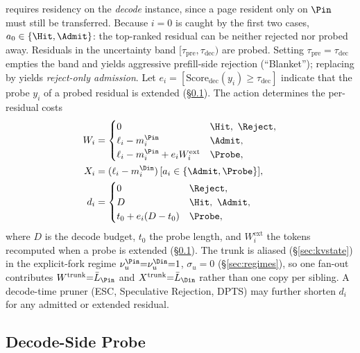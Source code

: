 \noindent
\Hit requires residency on the \emph{decode} instance, since a page resident only on $\Pin$ must still be transferred.
Because $i{=}0$ is caught by the first two cases, $a_0\in\{\Hit,\Admit\}$: the top-ranked residual can be neither rejected nor probed away.
Residuals in the uncertainty band $[\tau_{\mathrm{pre}},\tau_{\mathrm{dec}})$ are probed.
Setting $\tau_{\mathrm{pre}}{=}\tau_{\mathrm{dec}}$ empties the band and yields aggressive prefill-side rejection (``Blanket''); replacing \Probe by \Admit yields \emph{reject-only admission}.
Let $e_i{=}[\mathrm{Score}_{\mathrm{dec}}(y_i)\ge\tau_{\mathrm{dec}}]$ indicate that the probe $y_i$ of a probed residual is extended (\S\ref{sec:split}).
The action determines the per-residual costs
\begin{align}
W_i &=
\begin{cases}
0 & \Hit,\ \Reject,\\
\ell_i-m_i^{\Pin} & \Admit,\\
\ell_i-m_i^{\Pin}+e_iW_i^{\mathrm{ext}} & \Probe,
\end{cases}
\label{eq:work}\\
X_i &= (\ell_i-m_i^{\Din})\,[a_i\in\{\Admit,\Probe\}],
\label{eq:xfer}\\
d_i &=
\begin{cases}
0 & \Reject,\\
D & \Hit,\ \Admit,\\
t_0+e_i(D-t_0) & \Probe,
\end{cases}
\label{eq:dec}
\end{align}
where $D$ is the decode budget, $t_0$ the probe length, and $W_i^{\mathrm{ext}}$ the tokens recomputed when a probe is extended (\S\ref{sec:split}).
The trunk is aliased (\S\ref{sec:kvstate}) in the explicit-fork regime $\nu_u^{\Pin}{=}\nu_u^{\Din}{=}1$, $\sigma_u{=}0$ (\S\ref{sec:regimes}), so one fan-out contributes $W^{\mathrm{trunk}}{=}\bar L_{\Pin}$ and $X^{\mathrm{trunk}}{=}\bar L_{\Din}$ rather than one copy per sibling.
A decode-time pruner (ESC, Speculative Rejection, DPTS) may further shorten $d_i$ for any admitted or extended residual.

\subsection{Decode-Side Probe}
\label{sec:split}

